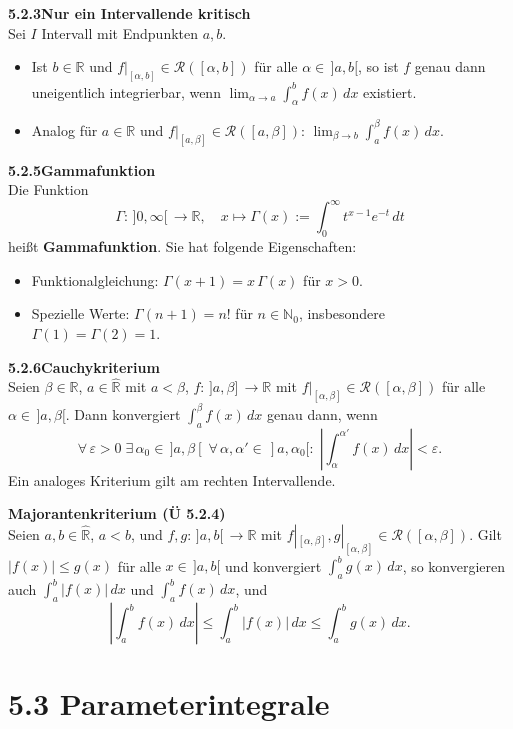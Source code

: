 \documentclass[a4paper,12pt]{article}
\newcommand{\gentry}[3]{%
  \noindent\textbf{#1\quad #2}\nopagebreak\\[0.2em]
  #3\par\smallskip
}
\begin{document}
\gentry{5.2.3}{Nur ein Intervallende kritisch}{%
  Sei $I$ Intervall mit Endpunkten $a, b$.
  \begin{itemize}[topsep=2pt,itemsep=1pt]
    \item[(i)] Ist $b \in \mathbb{R}$ und $f|_{[\alpha, b]} \in \mathcal{R}([\alpha,b])$
      für alle $\alpha \in\,]a,b[$, so ist $f$ genau dann uneigentlich
      integrierbar, wenn $\lim_{\alpha \to a} \int_\alpha^b f(x)\,dx$ existiert.
    \item[(ii)] Analog für $a \in \mathbb{R}$ und $f|_{[a,\beta]} \in \mathcal{R}([a,\beta])$:
      $\lim_{\beta \to b} \int_a^\beta f(x)\,dx$.
  \end{itemize}
}

\gentry{5.2.5}{Gammafunktion}{%
  Die Funktion
  \[
    \Gamma: \,]0,\infty[\, \to \mathbb{R}, \quad
    x \mapsto \Gamma(x) := \int_0^\infty t^{x-1} e^{-t}\,dt
  \]
  heißt \textbf{Gammafunktion}. Sie hat folgende Eigenschaften:
  \begin{itemize}[topsep=2pt,itemsep=1pt]
    \item Funktionalgleichung: $\Gamma(x+1) = x\,\Gamma(x)$ für $x>0$.
    \item Spezielle Werte: $\Gamma(n+1) = n!$ für $n \in \mathbb{N}_0$, insbesondere $\Gamma(1) = \Gamma(2) = 1$.
  \end{itemize}
}

\gentry{5.2.6}{Cauchykriterium}{%
  Seien $\beta \in \mathbb{R}$, $a \in \widehat{\mathbb{R}}$ mit $a < \beta$,
  $f: \,]a, \beta]\, \to \mathbb{R}$ mit $f|_{[\alpha, \beta]} \in \mathcal{R}([\alpha, \beta])$
  für alle $\alpha \in\,]a, \beta[$. Dann konvergiert $\int_a^\beta f(x)\,dx$
  genau dann, wenn
  \[
    \forall\, \varepsilon > 0\; \exists\, \alpha_0 \in\,]a,\beta[\;
    \forall\, \alpha, \alpha' \in\,]a, \alpha_0[:\;
    \left|\int_\alpha^{\alpha'} f(x)\,dx\right| < \varepsilon.
  \]
  Ein analoges Kriterium gilt am rechten Intervallende.
}

\gentry{}{Majorantenkriterium (Ü 5.2.4)}{%
  Seien $a, b \in \widehat{\mathbb{R}}$, $a<b$, und $f, g: \,]a,b[\, \to \mathbb{R}$
  mit $f|_{[\alpha,\beta]}, g|_{[\alpha,\beta]} \in \mathcal{R}([\alpha,\beta])$.
  Gilt $|f(x)| \leq g(x)$ für alle $x \in\,]a,b[$ und konvergiert $\int_a^b g(x)\,dx$,
  so konvergieren auch $\int_a^b |f(x)|\,dx$ und $\int_a^b f(x)\,dx$, und
  \[
    \left|\int_a^b f(x)\,dx\right| \leq \int_a^b |f(x)|\,dx \leq \int_a^b g(x)\,dx.
  \]
}

\section*{5.3 \quad Parameterintegrale}
\end{document}
